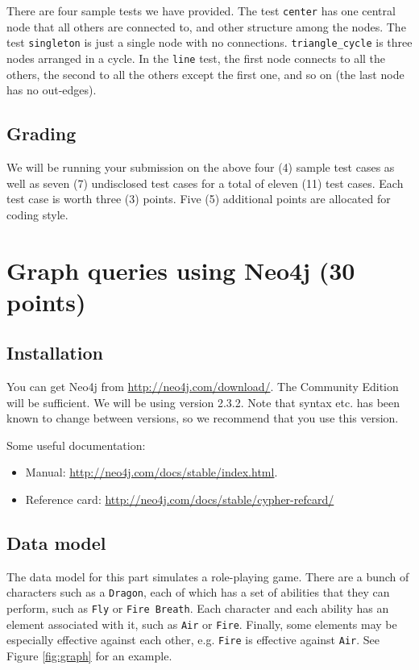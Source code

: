 \documentclass[10pt]{article}
\begin{document}
There are four sample tests we have provided. The test \texttt{center} has one central node that all others are connected to, and other structure among the nodes. The test \texttt{singleton} is just a single node with no connections. \texttt{triangle\_cycle} is three nodes arranged in a cycle. In the \texttt{line} test, the first node connects to all the others, the second to all the others except the first one, and so on (the last node has no out-edges).

\subsection{Grading}

We will be running your submission on the above four (4) sample test cases as well as seven (7) undisclosed test cases for a total of eleven (11) test cases. Each test case is worth three (3) points. Five (5) additional points are allocated for coding style.

\section{Graph queries using Neo4j (30 points)}

\subsection{Installation}

You can get Neo4j from \url{http://neo4j.com/download/}. The Community Edition will be sufficient. We will be using version 2.3.2. Note that syntax etc. has been known to change between versions, so we recommend that you use this version.

Some useful documentation:
\begin{itemize}
	\item Manual: \url{http://neo4j.com/docs/stable/index.html}.
	\item Reference card: \url{http://neo4j.com/docs/stable/cypher-refcard/}
\end{itemize}

\subsection{Data model}

The data model for this part simulates a role-playing game. There are a bunch of characters such as a \texttt{Dragon}, each of which has a set of abilities that they can perform, such as \texttt{Fly} or \texttt{Fire Breath}. Each character and each ability has an element associated with it, such as \texttt{Air} or \texttt{Fire}. Finally, some elements may be especially effective against each other, e.g. \texttt{Fire} is effective against \texttt{Air}. See Figure \ref{fig:graph} for an example.
\end{document}

